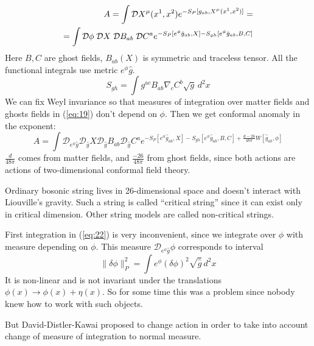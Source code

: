 \documentclass[a4paper,12pt]{article}
\theoremstyle{definition} \newtheorem{Def}{Definition}
\begin{document}
\begin{equation}
  \label{eq:19}
  \begin{split}
    A=\int {\cal D} X^{\mu}(x^1,x^2)e^{-S_P[g_{ab},X^{\mu}(x^1,x^2)]} = \\
    = \int {\cal D}\phi\; {\cal D}X\; \mathcal{D} B_{ab}\; \mathcal{D} C^a e^{-S_P [e^{\phi}\hat{g}_{ab},X]-
      S_{gh}[e^{\phi}\hat{g}_{ab},B,C]}
  \end{split}
\end{equation}
Here $B,C$ are ghost fields, $B_{ab}(X)$ is symmetric and traceless tensor. All the functional integrals use metric $e^{\phi}\hat{g}$. 
\begin{equation}
  \label{eq:21}
  S_{gh} = \int g^{ac} B_{ab} \nabla_c C^b \sqrt{g} \, d^2x
\end{equation}
We can fix Weyl invariance so that measures of integration over matter fields and ghosts fields in (\ref{eq:19}) don't depend on $\phi$. Then we get conformal anomaly in the exponent:
\begin{equation}
  \label{eq:22}
  A = \int \mathcal{D}_{e^{\phi} \hat{g}} \mathcal{D}_{\hat{g}} X \mathcal{D}_{\hat{g}} B_{ab} \mathcal{D}_{\hat{g}} C^a e^{-S_P [e^{\phi}\hat{g}_{ab},X]-S_{gh}[e^{\phi}\hat{g}_{ab},B,C]+\frac{d-26}{48\pi} W[\hat{g}_{ab},\phi]}
\end{equation}
$\frac{d}{48\pi}$ comes from matter fields, and $\frac{-26}{48\pi}$ from ghost fields, since both actions are actions of two-dimensional conformal field theory.

Ordinary bosonic string lives in 26-dimensional space and doesn't interact with Liouville's gravity. Such a string is called ``critical string'' since it can exist only in critical dimension. Other string models are called non-critical strings.

First integration in (\ref{eq:22}) is very inconvenient, since we integrate over $\phi$ with measure depending on $\phi$. This measure $\mathcal{D}_{e^{\phi}\hat{g}}\phi$ corresponds to interval
\begin{equation}
  \label{eq:23}
  \|\delta\phi\|^2_P = \int e^{\phi} (\delta\phi)^2 \sqrt{\hat{g}}\, d^2 x
\end{equation}
It is non-linear and is not invariant under the translations $\phi(x)\to \phi(x)+\eta(x)$.
So for some time this was a problem since nobody knew how to work with such objects.

But David-Distler-Kawai proposed to change action in order to take into account change of measure of integration to normal measure.
\end{document}
